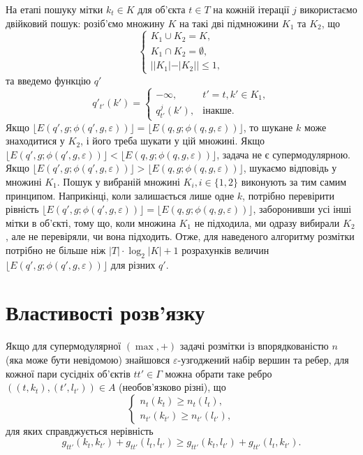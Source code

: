 На етапі пошуку мітки $k_t\in K$ для об'єкта $t\in T$ на кожній ітерації $j$
використаємо двійковий пошук: розіб'ємо множину $K$ на такі дві підмножини $K_1$ та $K_2$, що
\begin{equation*}
    \begin{cases}
        K_1\cup K_2 = K, \\
        K_1\cap K_2 = \emptyset, \\
        ||K_1|-|K_2|| \leq 1,
    \end{cases}
\end{equation*}
та введемо функцію $q'$
\begin{equation*}
    q'_{t'}(k') =
    \begin{cases}
        -\infty, & t'=t, k' \in  K_1,\\
        q^j_{t'}(k'), & \text{інакше.}
    \end{cases}
\end{equation*}
Якщо $\lfloor E(q',g;\phi(q',g,\varepsilon))\rfloor = \lfloor E(q,g;\phi(q,g,\varepsilon))\rfloor$, то шукане $k$ 
може знаходитися у $K_2$, і його треба шукати у цій множині. Якщо 
$\lfloor E(q',g;\phi(q',g,\varepsilon))\rfloor < \lfloor E(q,g;\phi(q,g,\varepsilon))\rfloor$, задача не є супермодулярною.
Якщо $\lfloor E(q',g;\phi(q',g,\varepsilon))\rfloor > \lfloor E(q,g;\phi(q,g,\varepsilon))\rfloor$, шукаємо відповідь у множині $K_1$.
Пошук у вибраній множині $K_i, i\in \{1,2\}$ виконують за тим самим принципом.
Наприкінці, коли залишається лише одне $k$, потрібно перевірити рівність 
$\lfloor E(q',g;\phi(q',g,\varepsilon))\rfloor = \lfloor E(q,g;\phi(q,g,\varepsilon))\rfloor$, 
заборонивши усі інші мітки в об'єкті, тому що, коли множина $K_1$ не підходила, ми 
одразу вибирали $K_2$, але не перевіряли, чи вона підходить. 
Отже, для наведеного алгоритму розмітки потрібно не більше ніж $|T|\cdot \log_2 |K| + 1$ 
розрахунків величин $\lfloor E(q',g;\phi(q',g,\varepsilon))\rfloor$ для різних $q'$.

\section{Властивості розв'язку}

Якщо для супермодулярної $(\max,+)$ задачі розмітки із впорядкованістю $n$ 
(яка може бути невідомою) знайшовся $\varepsilon$-узгоджений набір вершин та ребер, 
для кожної пари сусідніх об'єктів $tt'\in\Gamma$ можна обрати таке ребро 
$((t,k_t),(t',l_{t'}))\in A$ (необов'язково різні), що 
\begin{equation*}
    \begin{cases}
        n_t(k_t)\geq n_t(l_t),\\
        n_{t'}(k_{t'})\geq n_{t'}(l_{t'}),
    \end{cases}
\end{equation*}
для яких справджується нерівність 
\begin{equation*}
    g_{tt'}(k_t,k_{t'})+g_{tt'}(l_t,l_{t'})\geq g_{tt'}(k_t,l_{t'})+g_{tt'}(l_t,k_{t'}).
\end{equation*}

